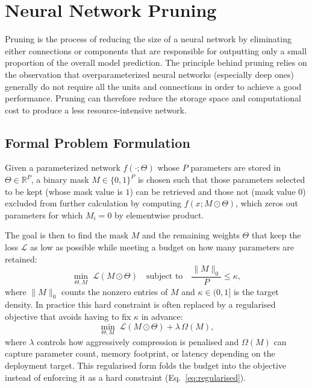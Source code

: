 \FloatBarrier
\section{Neural Network Pruning}

Pruning is the process of reducing the size of a neural network by eliminating either connections or components that are responsible for outputting only a small proportion of the overall model prediction. The principle behind pruning relies on the observation that overparameterized neural networks (especially deep ones) generally do not require all the units and connections in order to achieve a good performance. Pruning can therefore reduce the storage space and computational cost to produce a less resource-intensive network.
\subsection{Formal Problem Formulation}

Given a parameterized network $f(\cdot;\Theta)$ whose $P$ parameters are
stored in $\Theta \in \mathbb{R}^P$, a binary mask $M \in \{0,1\}^P$ is
chosen such that those parameters selected to be kept (whose mask value is
$1$) can be retrieved and those not (mask value $0$) excluded from further
calculation by computing $f(x; M \odot \Theta)$, which zeros out parameters
for which $M_i = 0$ by elementwise product.

The goal is then to find the mask $M$ and the remaining weights $\Theta$ that
keep the loss $\mathcal{L}$ as low as possible while meeting a budget on how
many parameters are retained:
\begin{equation}
	\min_{\Theta, M}\; \mathcal{L}(M \odot \Theta)
	\quad
	\text{subject to}
	\quad
	\frac{\lVert M \rVert_0}{P} \le \kappa,
	\label{eq:constrained}
\end{equation}
where $\lVert M \rVert_0$ counts the nonzero entries of $M$ and $\kappa \in
(0,1]$ is the target density. In practice this hard constraint is often
replaced by a regularised objective that avoids having to fix $\kappa$ in
advance:
\begin{equation}
	\min_{\Theta, M}\; \mathcal{L}(M \odot \Theta) + \lambda\,\Omega(M),
	\label{eq:regularised}
\end{equation}
where $\lambda$ controls how aggressively compression is penalised and
$\Omega(M)$ can capture parameter count, memory footprint, or latency
depending on the deployment target. This regularised form folds the budget into the objective instead of enforcing it as a hard constraint (Eq.~\eqref{eq:regularised}).

